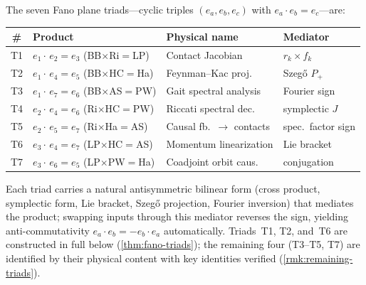 \begin{remark}
\noindent
The seven Fano plane triads---cyclic triples $(e_a, e_b, e_c)$
with $e_a \cdot e_b = e_c$---are:

\begin{center}
\footnotesize
\begin{tabular}{clll}
\hline
\# & Product & Physical name & Mediator \\
\hline
T1 & $e_1 {\cdot}\, e_2 {=} e_3$ (BB${\times}$Ri$=$LP)
   & Contact Jacobian & $r_k \times f_k$ \\
T2 & $e_1 {\cdot}\, e_4 {=} e_5$ (BB${\times}$HC$=$Ha)
   & Feynman--Kac proj.\ & Szeg\H{o} $P_+$ \\
T3 & $e_1 {\cdot}\, e_7 {=} e_6$ (BB${\times}$AS$=$PW)
   & Gait spectral analysis & Fourier sign \\
T4 & $e_2 {\cdot}\, e_4 {=} e_6$ (Ri${\times}$HC$=$PW)
   & Riccati spectral dec.\ & symplectic $J$ \\
T5 & $e_2 {\cdot}\, e_5 {=} e_7$ (Ri${\times}$Ha$=$AS)
   & Causal fb.\ $\to$ contacts & spec.\ factor sign \\
T6 & $e_3 {\cdot}\, e_4 {=} e_7$ (LP${\times}$HC$=$AS)
   & Momentum linearization & Lie bracket \\
T7 & $e_3 {\cdot}\, e_6 {=} e_5$ (LP${\times}$PW$=$Ha)
   & Coadjoint orbit caus.\ & conjugation \\
\hline
\end{tabular}
\end{center}

\noindent
Each triad carries a natural antisymmetric bilinear form (cross
product, symplectic form, Lie bracket, Szeg\H{o} projection,
Fourier inversion) that mediates the product; swapping inputs
through this mediator reverses the sign, yielding
anti-commutativity $e_a \cdot e_b = -e_b \cdot e_a$
automatically.
Triads~T1, T2, and~T6 are constructed in full below
(\cref{thm:fano-triads}); the remaining four (T3--T5, T7)
are identified by their physical content with key identities
verified (\cref{rmk:remaining-triads}).


\end{remark}
